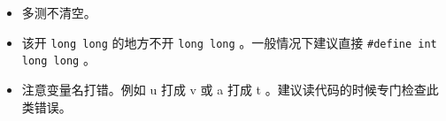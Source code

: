 \begin{itemize}
    \item 多测不清空。
    \item 该开 \verb|long long| 的地方不开 \verb|long long| 。一般情况下建议直接 \verb|#define int long long| 。
    \item 注意变量名打错。例如 u 打成 v 或 a 打成 t 。建议读代码的时候专门检查此类错误。
\end{itemize}